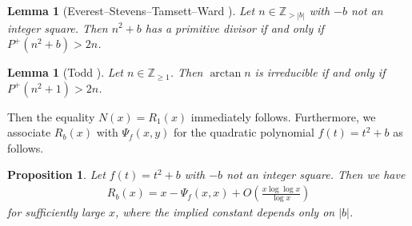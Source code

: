 \documentclass[a4paper,11pt]{amsart}
\newtheorem{lemma}[theorem]{Lemma}
\newtheorem{proposition}[theorem]{Proposition}
\theoremstyle{definition}
\numberwithin{equation}{section}
\begin{document}
\begin{lemma}[Everest--Stevens--Tamsett--Ward \cite{EverestStevensTamsettWard2007}]\label{lem:6.1}
Let $n \in \mathbb{Z}_{>|b|}$ with $-b$ not an integer square. 
Then $n^2+b$ has a primitive divisor if and only if $P^+(n^2+b)>2n$. 
\end{lemma}

\begin{lemma}[Todd \cite{Todd1949}]\label{lem:6.2}
Let $n \in \mathbb{Z}_{\geq1}$. 
Then $\arctan n$ is irreducible if and only if $P^+(n^2+1)>2n$. 
\end{lemma}

Then the equality $N(x)=R_1(x)$ immediately follows. 
Furthermore, we associate $R_b(x)$ with $\Psi_f(x,y)$ for the quadratic polynomial $f(t)=t^2+b$ as follows. 

\begin{proposition}\label{prop:6.3}
Let $f(t)=t^2+b$ with $-b$ not an integer square.  
Then we have
\begin{align*}
R_b(x)
= x-\Psi_f(x,x)
+ O\left(\frac{x \log\log{x}}{\log{x}}\right)
\end{align*}
for sufficiently large $x$, where the implied constant depends only on $|b|$. 
\end{proposition}
\end{document}
